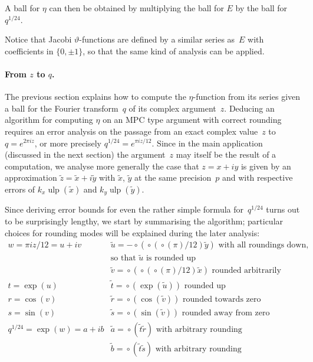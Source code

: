 \documentclass [11pt]{article}
\newcommand {\appro}[1]{\widetilde {#1}}
\newcommand {\Ulp}{{\operatorname {ulp}}}
\newcommand {\round}{\operatorname {\circ}}
\renewcommand {\theta}{\vartheta}
\begin{document}
A ball for $\eta$ can then be obtained by multiplying the ball for
$E$ by the ball for $q^{1/24}$.

Notice that Jacobi $\theta$-functions are defined by a similar series
as~$E$ with coefficients in $\{ 0, \pm 1 \}$, so that the same kind of
analysis can be applied.


\paragraph {From $z$ to $q$.}

The previous section explains how to compute the $\eta$-function from its
series given a ball for the Fourier transform~$q$ of its complex
argument~$z$. Deducing an algorithm for computing $\eta$ on an MPC type
argument with correct rounding requires an error analysis on the passage
from an exact complex value~$z$ to $q = e^{2 \pi i z}$, or more precisely
$q^{1/24} = e^{\pi i z / 12}$. Since in the main application (discussed in
the next section) the argument~$z$ may itself be the result of a
computation, we analyse more generally the case that $z = x + i y$ is given
by an approximation $\appro z = \appro x + i \appro y$ with $\appro x$,
$\appro y$ at the same precision~$p$ and with respective errors of
$k_x \Ulp (\appro x)$ and $k_y \Ulp (\appro y)$.

Since deriving error bounds for even the rather simple formula
for~$q^{1/24}$ turns out to be surprisingly lengthy, we start by
summarising the algorithm; particular choices for rounding modes will be
explained during the later analysis:
\[
\begin {array}{ll}
w = \pi i z / 12 = u + i v
   & \appro u = - \round (\round (\round (\pi) / 12) \appro y)
     \text { with all roundings down,} \\
   & \text {so that $\appro u$ is rounded up} \\
   & \appro v = \round (\round (\round (\pi) / 12) \appro x)
     \text { rounded arbitrarily} \\
t = \exp (u)
   & \appro t = \round (\exp (\appro u)) \text { rounded up} \\
r = \cos (v)
   & \appro r = \round (\cos (\appro v)) \text { rounded towards zero} \\
s = \sin (v)
   & \appro s = \round (\sin (\appro v)) \text { rounded away from zero} \\
q^{1/24} = \exp (w) = a + i b
   & \appro a = \round \left( \appro t \appro r \right)
     \text { with arbitrary rounding} \\
   & \appro b = \round \left( \appro t \appro s \right)
     \text { with arbitrary rounding}
\end {array}
\]
\end{document}
